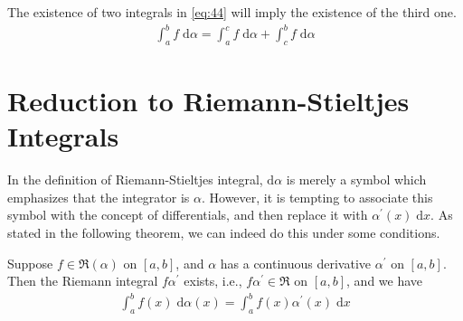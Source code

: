 \documentclass[thmcnt=section, 12pt]{my-elegantbook}
\begin{document}
\begin{theorem} \label{thm:25}
    The existence of two integrals in \eqref{eq:44} will imply the existence of the third one.
    \begin{align}
        \int_a^b f \; \mathrm{d}\alpha
        = \int_a^c f \; \mathrm{d}\alpha
        + \int_c^b f \; \mathrm{d}\alpha
        \label{eq:44}
    \end{align}
\end{theorem}


\section{Reduction to Riemann-Stieltjes Integrals}

\par In the definition of Riemann-Stieltjes integral, $\mathrm{d} \alpha$ is merely a symbol which emphasizes that the integrator is $\alpha$. However, it is tempting to associate this symbol with the concept of differentials, and then replace it with $\alpha^\prime(x) \; \mathrm{d} x$. As stated in the following theorem, we can indeed do this under some conditions.

\begin{theorem} \label{thm:23}
    Suppose $f \in \mathfrak{R}(\alpha)$ on $[a, b]$, and $\alpha$ has a continuous derivative $\alpha^\prime$ on $[a, b]$. Then the Riemann integral $f \alpha^\prime$ exists, i.e., $f \alpha^\prime \in \mathfrak{R}$ on $[a, b]$, and we have
    \begin{align}
        \int_{a}^{b} f(x) \; \mathrm{d}\alpha(x)
        = \int_{a}^{b} f(x) \alpha^\prime(x) \; \mathrm{d}x
        \label{eq:38}
    \end{align}
\end{theorem}
\end{document}

